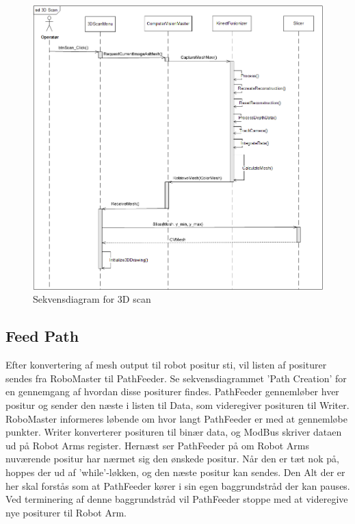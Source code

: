 \begin{figure}[H]
    \centering
    \includegraphics[width=1\textwidth]{figurer/d/Design/Sequence/sd_3Dscan}
    \caption{Sekvensdiagram for 3D scan}
    \label{sd_3Dscan}
\end{figure}
\newpage

\subsection{Feed Path}
Efter konvertering af mesh output til robot positur sti, vil listen af positurer sendes fra RoboMaster til PathFeeder. 
Se sekvensdiagrammet 'Path Creation' for en gennemgang af hvordan disse positurer findes.
PathFeeder gennemløber hver positur og sender den næste i listen til Data, som videregiver posituren til Writer.
RoboMaster informeres løbende om hvor langt PathFeeder er med at gennemløbe punkter.
Writer konverterer posituren til binær data, og ModBus skriver dataen ud på Robot Arms register.
Hernæst ser PathFeeder på om Robot Arms nuværende positur har nærmet sig den ønskede positur. 
Når den er tæt nok på, hoppes der ud af 'while'-løkken, og den næste positur kan sendes.
Den Alt der er her skal forstås som at PathFeeder kører i sin egen baggrundstråd der kan pauses. 
Ved terminering af denne baggrundstråd vil PathFeeder stoppe med at videregive nye positurer til Robot Arm.

